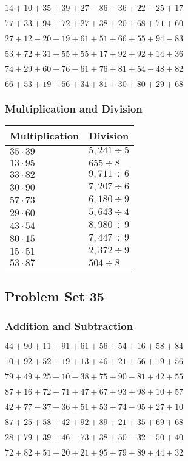 \(14+10+35+39+27-86-36+22-25+17\)

\(77+33+94+72+27+38+20+68+71+60\)

\(27+12-20-19+61+51+66+55+94-83\)

\(53+72+31+55+55+17+92+92+14+36\)

\(74+29+60-76-61+76+81+54-48+82\)

\(66+53+19+56+34+81+30+80+29+68\)

\hypertarget{multiplication-and-division-74}{%
\subsubsection{Multiplication and
Division}\label{multiplication-and-division-74}}

\begin{longtable}[]{@{}ll@{}}
\toprule
Multiplication & Division\tabularnewline
\midrule
\endhead
\(35\cdot39\) & \(5,241÷5\)\tabularnewline
\(13\cdot95\) & \(655÷8\)\tabularnewline
\(33\cdot82\) & \(9,711÷6\)\tabularnewline
\(30\cdot90\) & \(7,207÷6\)\tabularnewline
\(57\cdot73\) & \(6,180÷9\)\tabularnewline
\(29\cdot60\) & \(5,643÷4\)\tabularnewline
\(43\cdot54\) & \(8,980÷9\)\tabularnewline
\(80\cdot15\) & \(7,447÷9\)\tabularnewline
\(15\cdot51\) & \(2,372÷9\)\tabularnewline
\(53\cdot87\) & \(504÷8\)\tabularnewline
\bottomrule
\end{longtable}

\hypertarget{problem-set-35-1}{%
\subsection{Problem Set 35}\label{problem-set-35-1}}

\hypertarget{addition-and-subtraction-75}{%
\subsubsection{Addition and
Subtraction}\label{addition-and-subtraction-75}}

\(44+90+11+91+61+56+54+16+58+ 84\)

\(10+92+52+19+13+46+21+56+19+56\)

\(79+49+25-10-38+75+90-81+42+55\)

\(87+16+72+71+47+67+93+98+10+57\)

\(42+77-37-36+51+53+74-95+27+10\)

\(87+25+58+42+92+89+21+35+69+68\)

\(28+79+39+46-73+38+50-32-50+40\)

\(72+82+51+20+21+95+79+89+44+32\)

